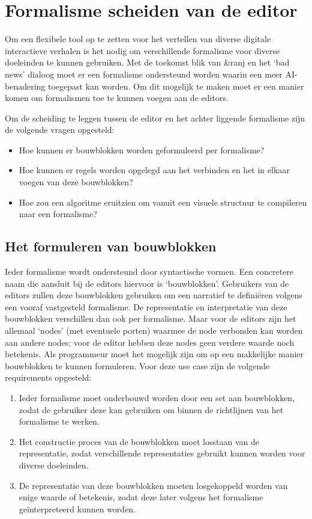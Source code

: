 \section{Formalisme scheiden van de editor}
Om een flexibele tool op te zetten voor het vertellen van diverse digitale interactieve verhalen is het nodig om verschillende formalisme voor diverse doeleinden te kunnen gebruiken. Met de toekomst blik van \&ranj en het ‘bad news’ dialoog moet er een formalisme ondersteund worden waarin een meer AI-benadering toegepast kan worden. Om dit mogelijk te maken moet er een manier komen om formalismen toe te kunnen voegen aan de editors.

Om de scheiding te leggen tussen de editor en het achter liggende formalisme zijn de volgende vragen opgesteld:

\begin{itemize}
    \item Hoe kunnen er bouwblokken worden geformuleerd per formalisme?
    \item Hoe kunnen er regels worden opgelegd aan het verbinden en het in elkaar voegen van deze bouwblokken?
    \item Hoe zou een algoritme eruitzien om vanuit een visuele structuur te compileren naar een formalisme?
\end{itemize}

\subsection{Het formuleren van bouwblokken}
\label{subsec:formulerenvanbouwblokken}
Ieder formalisme wordt ondersteund door syntactische vormen. Een concretere naam die aansluit bij de editors hiervoor is ‘bouwblokken’. Gebruikers van de editors zullen deze bouwblokken gebruiken om een narratief te definiëren volgens een vooraf vastgesteld formalisme. De representatie en interpretatie van deze bouwblokken verschillen dan ook per formalisme. Maar voor de editors zijn het allemaal ‘nodes’ (met eventuele porten) waarmee de node verbonden kan worden aan andere nodes; voor de editor hebben deze nodes geen verdere waarde noch betekenis. Als programmeur moet het mogelijk zijn om op een makkelijke manier bouwblokken te kunnen formuleren. Voor deze use case zijn de volgende requirements opgesteld:

\begin{enumerate}
    \item Ieder formalisme moet onderbouwd worden door een set aan bouwblokken, zodat de gebruiker deze kan gebruiken om binnen de richtlijnen van het formalisme te werken.
    \item Het constructie proces van de bouwblokken moet losstaan van de representatie, zodat verschillende representaties gebruikt kunnen worden voor diverse doeleinden.
    \item De representatie van deze bouwblokken moeten losgekoppeld worden van enige waarde of betekenis, zodat deze later volgens het formalisme geïnterpreteerd kunnen worden.
\end{enumerate}

